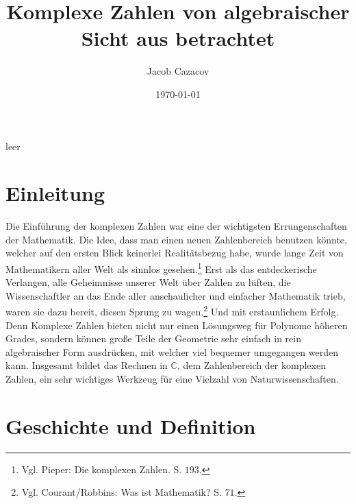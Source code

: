 \documentclass[a4paper,12pt]{article} %
\author{Jacob Cazacov}
\title{Komplexe Zahlen von algebraischer Sicht aus betrachtet}
\date{\today}
\begin{document}

\maketitle

\thispagestyle{empty}

\newpage
 leer
\thispagestyle{empty}

\newpage





\tableofcontents

\thispagestyle{empty}

\newpage


\section{Einleitung}

Die Einführung der komplexen Zahlen war eine der wichtigsten Errungenschaften der Mathematik.
Die Idee, dass man einen neuen Zahlenbereich benutzen könnte, welcher auf den ersten Blick keinerlei Realitätsbezug habe, wurde lange Zeit von Mathematikern aller Welt als sinnlos gesehen.\footnote{Vgl. Pieper: Die komplexen Zahlen. S. $193$.}
Erst als das entdeckerische Verlangen, alle Geheimnisse unserer Welt über Zahlen zu lüften, die Wissenschaftler an das Ende aller anschaulicher und einfacher Mathematik trieb, waren sie dazu bereit, diesen Sprung zu wagen.\footnote{Vgl. Courant/Robbins: Was ist Mathematik? S. $71$.}
Und mit erstaunlichem Erfolg.
Denn Komplexe Zahlen bieten nicht nur einen Lösungsweg für Polynome höheren Grades, sondern können große Teile der Geometrie sehr einfach in rein algebraischer Form ausdrücken, mit welcher viel bequemer umgegangen werden kann.
Insgesamt bildet das Rechnen in $\mathbb{C}$, dem Zahlenbereich der komplexen Zahlen, ein sehr wichtiges Werkzeug für eine Vielzahl von Naturwissenschaften.

\section{Geschichte und Definition}
\end{document}
